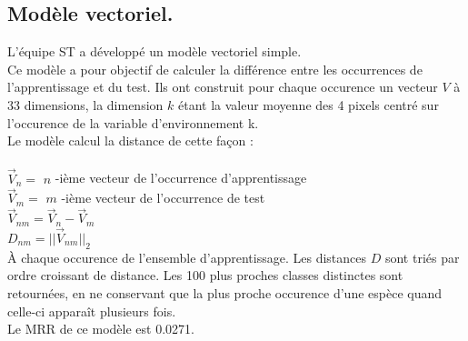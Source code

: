 \documentclass{article}
\begin{document}
\subsection{Modèle vectoriel.}
L'équipe ST a développé un modèle vectoriel simple. \\
Ce modèle a pour objectif de calculer la différence entre les occurrences de l'apprentissage et du test.
Ils ont construit pour chaque occurence un vecteur $V$ à 33 dimensions, la dimension $k$ étant la valeur moyenne des 4 pixels centré sur l’occurence de la variable d’environnement k.\\
Le modèle calcul la distance de cette façon :\\ \\
$\overrightarrow{V}_{n} = $ $n$ -ième vecteur de l'occurrence d'apprentissage \\
$\overrightarrow{V}_{m} = $ $m$ -ième vecteur de l'occurrence de test \\
$\overrightarrow{V}_{nm} = \overrightarrow{V}_{n} - \overrightarrow{V}_{m} $\\
$ D_{nm} = || \overrightarrow{V}_{nm} ||_{2}$\\
À chaque occurence de l’ensemble d’apprentissage. Les distances $D$ sont triés par ordre croissant de distance. Les 100 plus proches classes distinctes sont retournées, en ne conservant que la plus proche occurence d’une espèce quand celle-ci apparaît plusieurs fois.\\
Le MRR de ce modèle est 0.0271.
\end{document}
